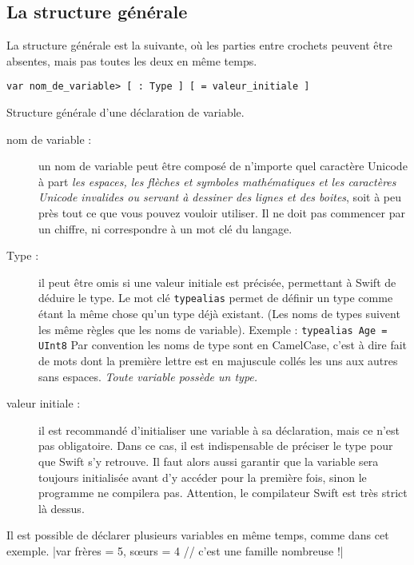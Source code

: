 \subsection{La structure générale}
La structure générale est la suivante,
où les parties entre crochets peuvent être absentes,
mais pas toutes les deux en même temps.

\begin{listing}[h]
\begin{verbatim}
var nom_de_variable> [ : Type ] [ = valeur_initiale ]
\end{verbatim}
\caption{Structure générale d'une déclaration de variable.}
\end{listing}

\begin{description}

\item[nom de variable :]
un nom de variable peut être composé de n'importe quel caractère Unicode
à part \emph{les espaces, les flèches et symboles mathématiques et les
caractères Unicode invalides ou servant à dessiner des lignes et des boites},
soit à peu près tout ce que vous pouvez vouloir utiliser.
Il ne doit pas commencer par un chiffre, ni correspondre à un mot clé du langage.


\item[Type :] il peut être omis si une valeur initiale est précisée,
permettant à Swift de déduire le type.
Le mot clé \texttt{typealias} permet de définir un type
comme étant la même chose qu'un type déjà existant.
(Les noms de types suivent les même règles que les noms de variable).
Exemple :
\texttt{typealias Age = UInt8}
Par convention les noms de type sont en CamelCase,
c'est à dire fait de mots dont la première lettre est en majuscule
collés les uns aux autres sans espaces.
\emph{Toute variable possède un type.}

\item[valeur initiale :]
il est recommandé d'initialiser une variable à sa déclaration,
mais ce n'est pas obligatoire.
Dans ce cas, il est indispensable de préciser le type pour que Swift s'y retrouve. 
Il faut alors aussi garantir que la variable sera toujours initialisée
avant d'y accéder pour la première fois, sinon le programme ne compilera pas.
Attention, le compilateur Swift est très strict là dessus.
\end{description}

Il est possible de déclarer plusieurs variables en même temps, comme dans cet exemple.
|var frères = 5, sœurs = 4 // c'est une famille nombreuse !|
